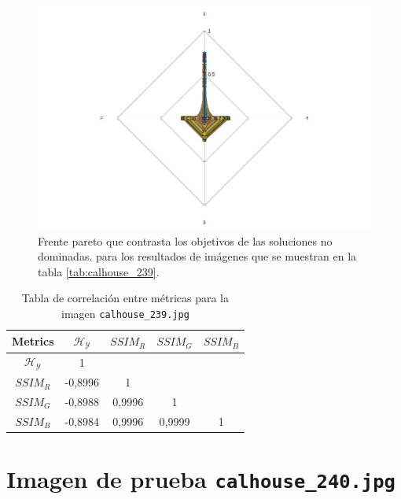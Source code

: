    \begin{figure}[H]
    \centering
    \includegraphics[width=\textwidth]{./Figures/calhouse_239/calhouse_239_2.jpg}
    \caption{Frente pareto que contrasta los objetivos de las soluciones no dominadas. para los resultados de imágenes que se muestran en la tabla \ref{tab:calhouse_239}.}
    \label{fig:calhouse2392fp}
    \end{figure}

\begin{table}[H]
\setlength{\abovecaptionskip}{2pt plus 3pt minus 2pt} %
\caption[Parámetros de entrada para $MOPSO$]{Tabla de correlación entre métricas para la imagen \texttt{calhouse\_239.jpg}}
\begin{center}
 \begin{tabular}{||c | c c c c||} 
 \hline
Metrics & $\mathscr{H_Y}$ & $SSIM_R$ & $SSIM_G$ & $SSIM_B$ \\ 
\hline
$\mathscr{H_Y}$ & 1 &  &  & \\ 
\hline
$SSIM_R$ & -0,8996 & 1 &  \\ 
\hline
$SSIM_G$ & -0,8988 & 0,9996  & 1  & \\ 
\hline
$SSIM_B$ & -0,8984 & 0,9996  & 0,9999  & 1 \\ 
\hline
\end{tabular}
\end{center}
\label{table:correlacion}
\end{table}


\section{Imagen de prueba \texttt{calhouse\_240.jpg}}

